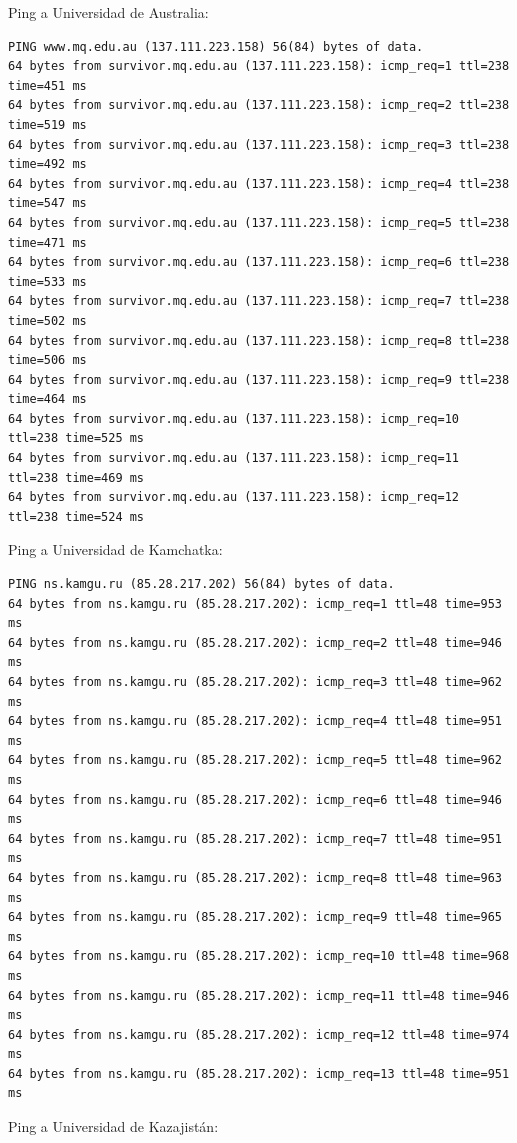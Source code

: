 Ping a Universidad de Australia:
\begin{verbatim}
PING www.mq.edu.au (137.111.223.158) 56(84) bytes of data.
64 bytes from survivor.mq.edu.au (137.111.223.158): icmp_req=1 ttl=238 time=451 ms
64 bytes from survivor.mq.edu.au (137.111.223.158): icmp_req=2 ttl=238 time=519 ms
64 bytes from survivor.mq.edu.au (137.111.223.158): icmp_req=3 ttl=238 time=492 ms
64 bytes from survivor.mq.edu.au (137.111.223.158): icmp_req=4 ttl=238 time=547 ms
64 bytes from survivor.mq.edu.au (137.111.223.158): icmp_req=5 ttl=238 time=471 ms
64 bytes from survivor.mq.edu.au (137.111.223.158): icmp_req=6 ttl=238 time=533 ms
64 bytes from survivor.mq.edu.au (137.111.223.158): icmp_req=7 ttl=238 time=502 ms
64 bytes from survivor.mq.edu.au (137.111.223.158): icmp_req=8 ttl=238 time=506 ms
64 bytes from survivor.mq.edu.au (137.111.223.158): icmp_req=9 ttl=238 time=464 ms
64 bytes from survivor.mq.edu.au (137.111.223.158): icmp_req=10 ttl=238 time=525 ms
64 bytes from survivor.mq.edu.au (137.111.223.158): icmp_req=11 ttl=238 time=469 ms
64 bytes from survivor.mq.edu.au (137.111.223.158): icmp_req=12 ttl=238 time=524 ms
\end{verbatim}

Ping a Universidad de Kamchatka:

\begin{verbatim}
PING ns.kamgu.ru (85.28.217.202) 56(84) bytes of data.
64 bytes from ns.kamgu.ru (85.28.217.202): icmp_req=1 ttl=48 time=953 ms
64 bytes from ns.kamgu.ru (85.28.217.202): icmp_req=2 ttl=48 time=946 ms
64 bytes from ns.kamgu.ru (85.28.217.202): icmp_req=3 ttl=48 time=962 ms
64 bytes from ns.kamgu.ru (85.28.217.202): icmp_req=4 ttl=48 time=951 ms
64 bytes from ns.kamgu.ru (85.28.217.202): icmp_req=5 ttl=48 time=962 ms
64 bytes from ns.kamgu.ru (85.28.217.202): icmp_req=6 ttl=48 time=946 ms
64 bytes from ns.kamgu.ru (85.28.217.202): icmp_req=7 ttl=48 time=951 ms
64 bytes from ns.kamgu.ru (85.28.217.202): icmp_req=8 ttl=48 time=963 ms
64 bytes from ns.kamgu.ru (85.28.217.202): icmp_req=9 ttl=48 time=965 ms
64 bytes from ns.kamgu.ru (85.28.217.202): icmp_req=10 ttl=48 time=968 ms
64 bytes from ns.kamgu.ru (85.28.217.202): icmp_req=11 ttl=48 time=946 ms
64 bytes from ns.kamgu.ru (85.28.217.202): icmp_req=12 ttl=48 time=974 ms
64 bytes from ns.kamgu.ru (85.28.217.202): icmp_req=13 ttl=48 time=951 ms
\end{verbatim}

Ping a Universidad de Kazajistán:

